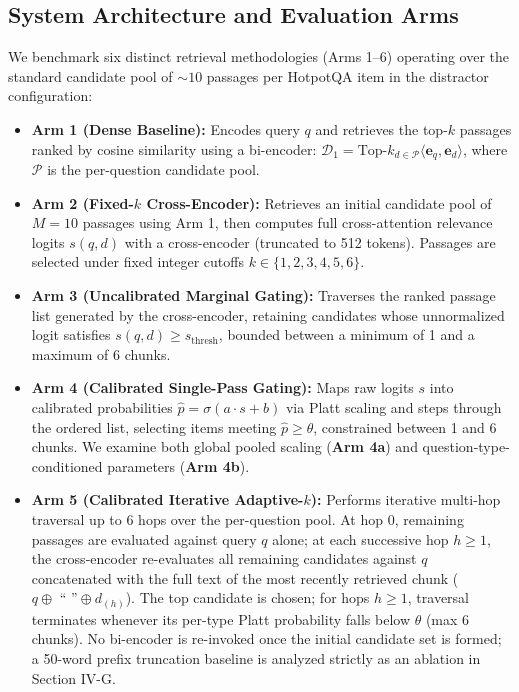 \documentclass{article}
\begin{document}
\subsection{System Architecture and Evaluation Arms}
We benchmark six distinct retrieval methodologies (Arms 1--6) operating over the standard candidate pool of $\sim 10$ passages per HotpotQA item in the distractor configuration:
\begin{itemize}
    \item \textbf{Arm 1 (Dense Baseline):} Encodes query $q$ and retrieves the top-$k$ passages ranked by cosine similarity using a bi-encoder: $\mathcal{D}_1 = \text{Top-}k_{d \in \mathcal{P}} \langle \mathbf{e}_q, \mathbf{e}_d \rangle$, where $\mathcal{P}$ is the per-question candidate pool.
    \item \textbf{Arm 2 (Fixed-$k$ Cross-Encoder):} Retrieves an initial candidate pool of $M=10$ passages using Arm 1, then computes full cross-attention relevance logits $s(q, d)$ with a cross-encoder (truncated to 512 tokens). Passages are selected under fixed integer cutoffs $k \in \{1, 2, 3, 4, 5, 6\}$.
    \item \textbf{Arm 3 (Uncalibrated Marginal Gating):} Traverses the ranked passage list generated by the cross-encoder, retaining candidates whose unnormalized logit satisfies $s(q, d) \ge s_{\text{thresh}}$, bounded between a minimum of 1 and a maximum of 6 chunks.
    \item \textbf{Arm 4 (Calibrated Single-Pass Gating):} Maps raw logits $s$ into calibrated probabilities $\hat{p} = \sigma(a \cdot s + b)$ via Platt scaling and steps through the ordered list, selecting items meeting $\hat{p} \ge \theta$, constrained between 1 and 6 chunks. We examine both global pooled scaling (\textbf{Arm 4a}) and question-type-conditioned parameters (\textbf{Arm 4b}).
    \item \textbf{Arm 5 (Calibrated Iterative Adaptive-$k$):} Performs iterative multi-hop traversal up to 6 hops over the per-question pool. At hop 0, remaining passages are evaluated against query $q$ alone; at each successive hop $h \ge 1$, the cross-encoder re-evaluates all remaining candidates against $q$ concatenated with the full text of the most recently retrieved chunk ($q \oplus \text{ `` ''} \oplus d_{(h)}$). The top candidate is chosen; for hops $h \ge 1$, traversal terminates whenever its per-type Platt probability falls below $\theta$ (max 6 chunks). No bi-encoder is re-invoked once the initial candidate set is formed; a 50-word prefix truncation baseline is analyzed strictly as an ablation in Section IV-G.

\end{itemize}
\end{document}
